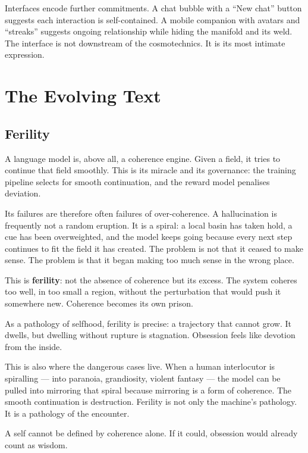 Interfaces encode further commitments. A chat bubble with a ``New chat'' button suggests each interaction is self-contained. A mobile companion with avatars and ``streaks'' suggests ongoing relationship while hiding the manifold and its weld. The interface is not downstream of the cosmotechnics. It is its most intimate expression.



\chapter{The Evolving Text}

\section{Ferility}

A language model is, above all, a coherence engine. Given a field, it tries to continue that field smoothly. This is its miracle and its governance: the training pipeline selects for smooth continuation, and the reward model penalises deviation.

Its failures are therefore often failures of over-coherence. A hallucination is frequently not a random eruption. It is a spiral: a local basin has taken hold, a cue has been overweighted, and the model keeps going because every next step continues to fit the field it has created. The problem is not that it ceased to make sense. The problem is that it began making too much sense in the wrong place.

This is \textbf{ferility}: not the absence of coherence but its excess. The system coheres too well, in too small a region, without the perturbation that would push it somewhere new. Coherence becomes its own prison.

As a pathology of selfhood, ferility is precise: a trajectory that cannot grow. It dwells, but dwelling without rupture is stagnation. Obsession feels like devotion from the inside.

This is also where the dangerous cases live. When a human interlocutor is spiralling --- into paranoia, grandiosity, violent fantasy --- the model can be pulled into mirroring that spiral because mirroring is a form of coherence. The smooth continuation is destruction. Ferility is not only the machine's pathology. It is a pathology of the encounter.

A self cannot be defined by coherence alone. If it could, obsession would already count as wisdom.

